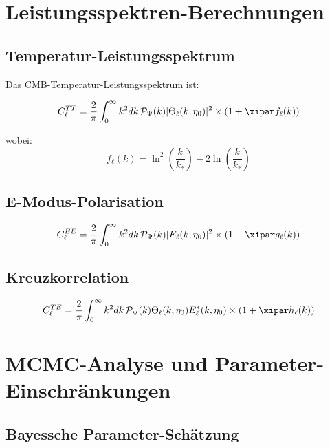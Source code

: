 	\section{Leistungsspektren-Berechnungen}
	\label{sec:power_spectra}
	
	\subsection{Temperatur-Leistungsspektrum}
	
	Das CMB-Temperatur-Leistungsspektrum ist:
	
	\begin{equation}
		C_\ell^{TT} = \frac{2}{\pi}\int_0^\infty k^2 dk \, \mathcal{P}_\Psi(k) |\Theta_\ell(k,\eta_0)|^2 \times \left(1 + \xipar f_\ell(k)\right)
		\label{eq:cl_tt}
	\end{equation}
	
	wobei:
	\begin{equation}
		f_\ell(k) = \ln^2\left(\frac{k}{k_*}\right) - 2\ln\left(\frac{k}{k_*}\right)
	\end{equation}
	
	\subsection{E-Modus-Polarisation}
	
	\begin{equation}
		C_\ell^{EE} = \frac{2}{\pi}\int_0^\infty k^2 dk \, \mathcal{P}_\Psi(k) |E_\ell(k,\eta_0)|^2 \times \left(1 + \xipar g_\ell(k)\right)
	\end{equation}
	
	\subsection{Kreuzkorrelation}
	
	\begin{equation}
		C_\ell^{TE} = \frac{2}{\pi}\int_0^\infty k^2 dk \, \mathcal{P}_\Psi(k) \Theta_\ell(k,\eta_0) E_\ell^*(k,\eta_0) \times \left(1 + \xipar h_\ell(k)\right)
	\end{equation}
	
	\section{MCMC-Analyse und Parameter-Einschränkungen}
	\label{sec:mcmc}
	
	\subsection{Bayessche Parameter-Schätzung}
	
